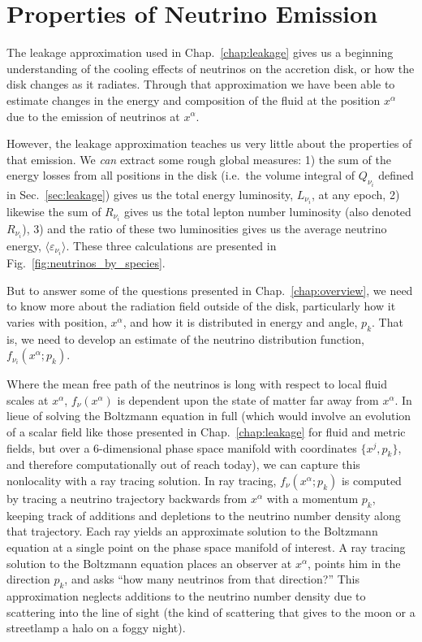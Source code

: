 \chapter{Properties of Neutrino Emission}
\label{chap:ray_tracing}

The leakage approximation used in Chap.~\ref{chap:leakage} gives us a beginning
understanding of the cooling effects of neutrinos on the accretion disk, or
how the disk changes as it radiates. Through that approximation we have been able
to estimate changes in the energy and composition of the fluid at the position
$x^\alpha$ due to the emission of neutrinos at $x^\alpha$.

However, the leakage approximation teaches us very little about the properties of
that emission. We \emph{can} extract some rough global measures:
1) the sum of the energy losses from all positions in the disk (i.e.\
the volume integral of $Q_{\nu_i}$ defined in Sec.~\ref{sec:leakage})
gives us the total energy luminosity, $L_{\nu_i}$, at any epoch,
2) likewise the sum of $R_{\nu_i}$ gives us the total lepton number luminosity
(also denoted $R_{\nu_i}$),
3) and the ratio of these two luminosities gives us the average neutrino energy,
$\langle \varepsilon_{\nu_i} \rangle$. These three calculations are presented in
Fig.~\ref{fig:neutrinos_by_species}.

But to answer some of the questions presented in Chap.~\ref{chap:overview}, we
need to know more about the radiation field outside of the disk, particularly
how it varies with position, $x^\alpha$, and how it is distributed in energy and
angle, $p_k$.
That is, we need to develop an estimate of the neutrino distribution function,
$f_{\nu_i}(x^\alpha;p_k)$.

Where the mean free path of the neutrinos is long with respect to local fluid
\todo{show this is the case}
scales at $x^\alpha$, $f_\nu(x^\alpha)$ is dependent upon the state of matter
far away from $x^\alpha$. In lieue of solving the Boltzmann equation in full
\todo{ref eqn in Chap.~\ref{chap:intro}}
(which would involve an evolution of a scalar field like those presented in
Chap.~\ref{chap:leakage} for fluid and metric fields, but over a 6-dimensional
phase space manifold with coordinates $\{x^j,p_k\}$, and therefore
computationally out of reach today),
we can capture this nonlocality with a ray tracing solution.
In ray tracing, $f_\nu(x^\alpha;p_k)$ is computed by tracing a neutrino trajectory
backwards from $x^\alpha$ with a momentum $p_k$, keeping track of additions
and depletions to the neutrino number density along that trajectory.
Each ray yields an approximate solution to the Boltzmann equation at a
single point on the phase space manifold of interest. A ray
tracing solution to the Boltzmann equation places an observer at $x^\alpha$,
points him in the direction $p_k$, and asks ``how many neutrinos from that
direction?''
This approximation neglects additions to the neutrino number density due to
scattering into the line of sight (the kind of scattering that gives to the
moon or a streetlamp a halo on a foggy night).


